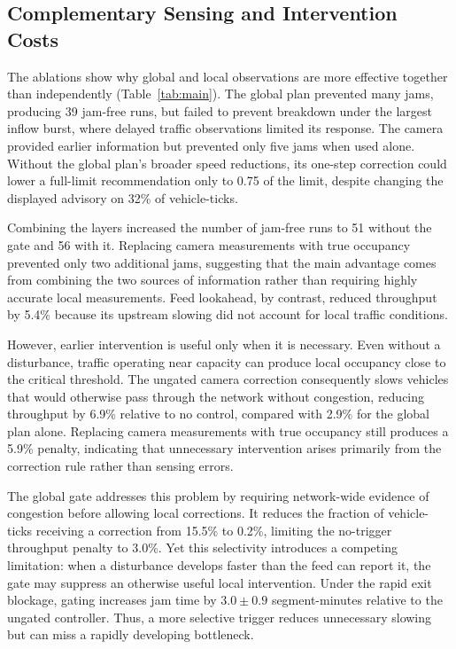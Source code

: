 \documentclass[letterpaper, 10pt, journal, twoside]{IEEEtran}
\begin{document}
\subsection{Complementary Sensing and Intervention Costs}

\label{sec:ablation}

\label{sec:notrigger}

The ablations show why global and local observations are more effective together than independently (Table~\ref{tab:main}). The global plan prevented many jams, producing 39 jam-free runs, but failed to prevent breakdown under the largest inflow burst, where delayed traffic observations limited its response. The camera provided earlier information but prevented only five jams when used alone. Without the global plan's broader speed reductions, its one-step correction could lower a full-limit recommendation only to 0.75 of the limit, despite changing the displayed advisory on 32\% of vehicle-ticks.

Combining the layers increased the number of jam-free runs to 51 without the gate and 56 with it. Replacing camera measurements with true occupancy prevented only two additional jams, suggesting that the main advantage comes from combining the two sources of information rather than requiring highly accurate local measurements. Feed lookahead, by contrast, reduced throughput by 5.4\% because its upstream slowing did not account for local traffic conditions.

However, earlier intervention is useful only when it is necessary. Even without a disturbance, traffic operating near capacity can produce local occupancy close to the critical threshold. The ungated camera correction consequently slows vehicles that would otherwise pass through the network without congestion, reducing throughput by 6.9\% relative to no control, compared with 2.9\% for the global plan alone. Replacing camera measurements with true occupancy still produces a 5.9\% penalty, indicating that unnecessary intervention arises primarily from the correction rule rather than sensing errors.

The global gate addresses this problem by requiring network-wide evidence of congestion before allowing local corrections. It reduces the fraction of vehicle-ticks receiving a correction from 15.5\% to 0.2\%, limiting the no-trigger throughput penalty to 3.0\%. Yet this selectivity introduces a competing limitation: when a disturbance develops faster than the feed can report it, the gate may suppress an otherwise useful local intervention. Under the rapid exit blockage, gating increases jam time by $3.0\pm0.9$ segment-minutes relative to the ungated controller. Thus, a more selective trigger reduces unnecessary slowing but can miss a rapidly developing bottleneck.
\end{document}

